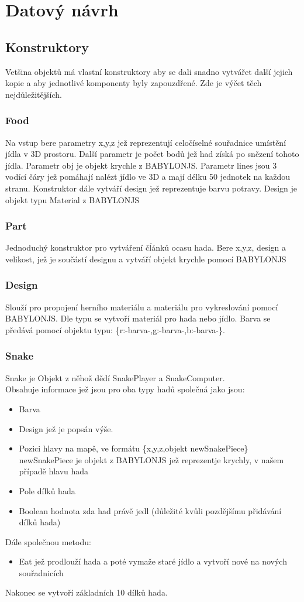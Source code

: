 \documentclass[a4paper,titlepage]{article}
\begin{document}
	\section{Datový návrh}
	\subsection{Konstruktory}
		Vetšina objektů má vlastní konstruktory aby se dali snadno vytvářet další jejich kopie a
		aby jednotlivé komponenty byly zapouzdřené. Zde je výčet těch nejdůležitějších.
	\subsubsection{Food}
		Na vstup bere parametry x,y,z jež reprezentují celočíselné souřadnice umístění jídla v 3D prostoru.
		Další parametr je počet bodů jež had získá po snězení tohoto jídla.
		Parametr obj je objekt krychle z BABYLONJS.
		Parametr lines jsou 3 vodící čáry jež pomáhají nalézt jídlo ve 3D
		a mají délku 50 jednotek na každou stranu.
		Konstruktor dále vytváří design jež reprezentuje barvu potravy.
		Design je objekt typu Material z BABYLONJS
	\subsubsection{Part}
		Jednoduchý konstruktor pro vytváření čĺánků ocasu hada.
		Bere x,y,z, design a velikost, jež je součástí designu a vytváří objekt krychle pomocí BABYLONJS
	\subsubsection{Design}
		Slouží pro propojení herního materiálu a materiálu pro vykreslování pomocí BABYLONJS.
		Dle typu se vytvoří materiál pro hada nebo jídlo.
		Barva se předává pomocí objektu typu: \{r:-barva-,g:-barva-,b:-barva-\}.
	\subsubsection{Snake}
		Snake je Objekt z něhož dědí SnakePlayer a SnakeComputer.\\
		Obsahuje informace jež jsou pro oba typy hadů společná jako jsou:\\		
		\begin{itemize}
			\item Barva
			\item Design jež je popsán výše.
			\item Pozici hlavy na mapě, ve formátu \{x,y,z,objekt newSnakePiece\}
				newSnakePiece je objekt z BABYLONJS jež reprezentje krychly, v našem případě hlavu hada
			\item Pole dílků hada
			\item Boolean hodnota zda had právě jedl (důležité kvůli pozdějšímu přidávání dílků hada)		
		\end{itemize}
		Dále společnou metodu:\\
		\begin{itemize}
			\item Eat jež prodlouží hada a poté vymaže staré jídlo a vytvoří nové na nových souřadnicích\\				
		\end{itemize}
		Nakonec se vytvoří základních 10 dílků hada.
\end{document}

